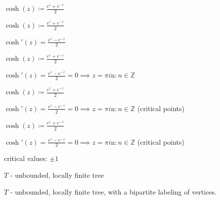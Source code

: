 \documentclass{beamer}
\begin{document}
\begin{frame} 

$\cosh(z) \coloneqq \frac{e^z+e^{-z}}{2}$

\end{frame}


\begin{frame} 

$\cosh(z) \coloneqq \frac{e^z+e^{-z}}{2}$

$\cosh'(z) = \frac{e^z-e^{-z}}{2}$

\end{frame}


\begin{frame} 

$\cosh(z) \coloneqq \frac{e^z+e^{-z}}{2}$

$\cosh'(z) = \frac{e^z-e^{-z}}{2} = 0 \implies z = \pi i \text{n} : n \in \mathbb{Z}$

\end{frame}


\begin{frame} 

$\cosh(z) \coloneqq \frac{e^z+e^{-z}}{2}$

$\cosh'(z) = \frac{e^z-e^{-z}}{2} = 0 \implies z = \pi i \text{n} : n \in \mathbb{Z}$ (critical points)

\end{frame}




\begin{frame} 

$\cosh(z) \coloneqq \frac{e^z+e^{-z}}{2}$

$\cosh'(z) = \frac{e^z-e^{-z}}{2} = 0 \implies z = \pi i \text{n} : n \in \mathbb{Z}$ (critical points)

\vspace{5mm}

critical values: $\pm 1$ 

\end{frame}






\begin{frame}

$T$ - unbounded, locally finite tree

\end{frame}


\begin{frame}

$T$ - unbounded, locally finite tree, with a bipartite labeling of vertices.

\end{frame}
\end{document}
